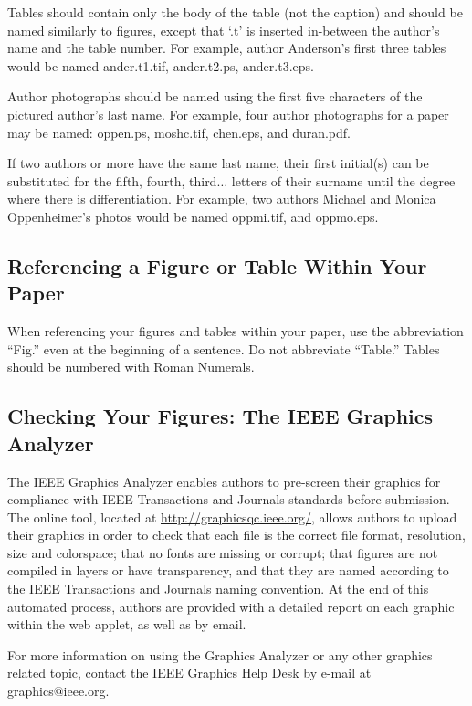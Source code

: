 \documentclass[twoside,web]{ieeecolor}
\begin{document}
Tables should contain only the body of the table (not the caption) and 
should be named similarly to figures, except that `.t' is inserted 
in-between the author's name and the table number. For example, author 
Anderson's first three tables would be named ander.t1.tif, ander.t2.ps, 
ander.t3.eps.

Author photographs should be named using the first five characters of the 
pictured author's last name. For example, four author photographs for a 
paper may be named: oppen.ps, moshc.tif, chen.eps, and duran.pdf.

If two authors or more have the same last name, their first initial(s) can 
be substituted for the fifth, fourth, third$\ldots$ letters of their surname 
until the degree where there is differentiation. For example, two authors 
Michael and Monica Oppenheimer's photos would be named oppmi.tif, and 
oppmo.eps.

\subsection{Referencing a Figure or Table Within Your Paper}
When referencing your figures and tables within your paper, use the 
abbreviation ``Fig.'' even at the beginning of a sentence. Do not abbreviate 
``Table.'' Tables should be numbered with Roman Numerals.

\subsection{Checking Your Figures: The IEEE Graphics Analyzer}
The IEEE Graphics Analyzer enables authors to pre-screen their graphics for 
compliance with IEEE Transactions and Journals standards before submission. 
The online tool, located at
\underline{http://graphicsqc.ieee.org/}, allows authors to 
upload their graphics in order to check that each file is the correct file 
format, resolution, size and colorspace; that no fonts are missing or 
corrupt; that figures are not compiled in layers or have transparency, and 
that they are named according to the IEEE Transactions and Journals naming 
convention. At the end of this automated process, authors are provided with 
a detailed report on each graphic within the web applet, as well as by 
email.

For more information on using the Graphics Analyzer or any other graphics 
related topic, contact the IEEE Graphics Help Desk by e-mail at 
graphics@ieee.org.
\end{document}

